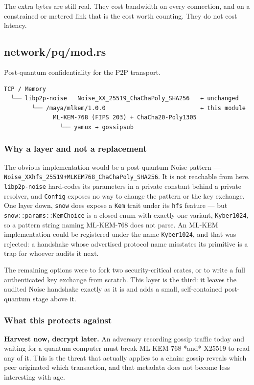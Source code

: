 \documentclass[11pt,a4paper]{article}
\begin{document}
The extra bytes are still real. They cost bandwidth on every connection, and
on a constrained or metered link that is the cost worth counting. They do
not cost latency.

\subsection{network/pq/mod.rs}
Post-quantum confidentiality for the P2P transport.

\begin{verbatim}
TCP / Memory
  └── libp2p-noise   Noise_XX_25519_ChaChaPoly_SHA256   ← unchanged
        └── /maya/mlkem/1.0.0                           ← this module
              ML-KEM-768 (FIPS 203) + ChaCha20-Poly1305
                └── yamux → gossipsub
\end{verbatim}

\subsubsection{Why a layer and not a replacement}

The obvious implementation would be a post-quantum Noise pattern —
\texttt{Noise\_XXhfs\_25519+MLKEM768\_ChaChaPoly\_SHA256}. It is not reachable from
here. \texttt{libp2p-noise} hard-codes its parameters in a private constant behind
a private resolver, and \texttt{Config} exposes no way to change the pattern or the
key exchange. One layer down, \texttt{snow} does expose a \texttt{Kem} trait under its
\texttt{hfs} feature — but \texttt{snow::params::KemChoice} is a closed enum with exactly
one variant, \texttt{Kyber1024}, so a pattern string naming ML-KEM-768 does not
parse. An ML-KEM implementation could be registered under the name
\texttt{Kyber1024}, and that was rejected: a handshake whose advertised protocol
name misstates its primitive is a trap for whoever audits it next.

The remaining options were to fork two security-critical crates, or to write
a full authenticated key exchange from scratch. This layer is the third: it
leaves the audited Noise handshake exactly as it is and adds a small,
self-contained post-quantum stage above it.

\subsubsection{What this protects against}

\textbf{Harvest now, decrypt later.} An adversary recording gossip traffic today
and waiting for a quantum computer must break ML-KEM-768 *and* X25519 to
read any of it. This is the threat that actually applies to a chain: gossip
reveals which peer originated which transaction, and that metadata does not
become less interesting with age.
\end{document}
